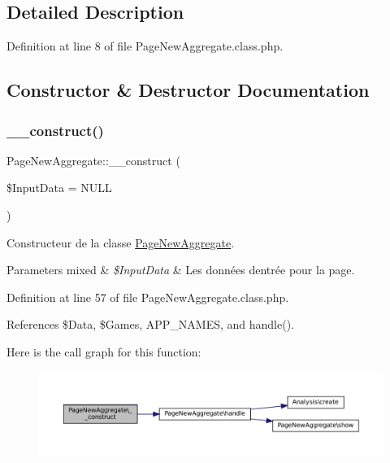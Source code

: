 \subsection{Detailed Description}


Definition at line 8 of file Page\+New\+Aggregate.\+class.\+php.



\subsection{Constructor \& Destructor Documentation}
\mbox{\label{class_page_new_aggregate_a393fae93301b4baecf79b221a31c4eb5}} 
\subsubsection{\texorpdfstring{\+\_\+\+\_\+construct()}{\_\_construct()}}
{\footnotesize\ttfamily Page\+New\+Aggregate\+::\+\_\+\+\_\+construct (\begin{DoxyParamCaption}\item[{}]{\$\+Input\+Data = {\ttfamily NULL} }\end{DoxyParamCaption})}

Constructeur de la classe \hyperlink{class_page_new_aggregate}{Page\+New\+Aggregate}.


\begin{DoxyParams}[1]{Parameters}
mixed & {\em \$\+Input\+Data} & Les données d\textquotesingle{}entrée pour la page. \\
\hline
\end{DoxyParams}


Definition at line 57 of file Page\+New\+Aggregate.\+class.\+php.



References \$\+Data, \$\+Games, A\+P\+P\+\_\+\+N\+A\+M\+ES, and handle().

Here is the call graph for this function\+:\nopagebreak
\begin{figure}[H]
\begin{center}
\leavevmode
\includegraphics[width=350pt]{class_page_new_aggregate_a393fae93301b4baecf79b221a31c4eb5_cgraph}
\end{center}
\end{figure}


